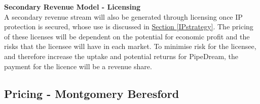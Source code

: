 \documentclass[11pt]{article}		%
\newcommand{\sectref}[1]{\hyperref[#1]{Section \ref*{#1}}}     %
\begin{document}
           \textbf{Secondary Revenue Model - Licensing}
           \\
           A secondary revenue stream will also be generated through licensing once IP protection is secured, whose use is discussed in \sectref{IPstrategy}. 
           The pricing of these licenses will be dependent on the potential for economic profit and the risks that the licensee will have in each market. %
           To minimise risk for the licensee, and therefore increase the uptake and potential returns for PipeDream, the payment for the licence will be a revenue share. %
            
            \subsection[Pricing]{Pricing - Montgomery Beresford} \label{revenue_model}\label{pricing}
                    
\end{document}
